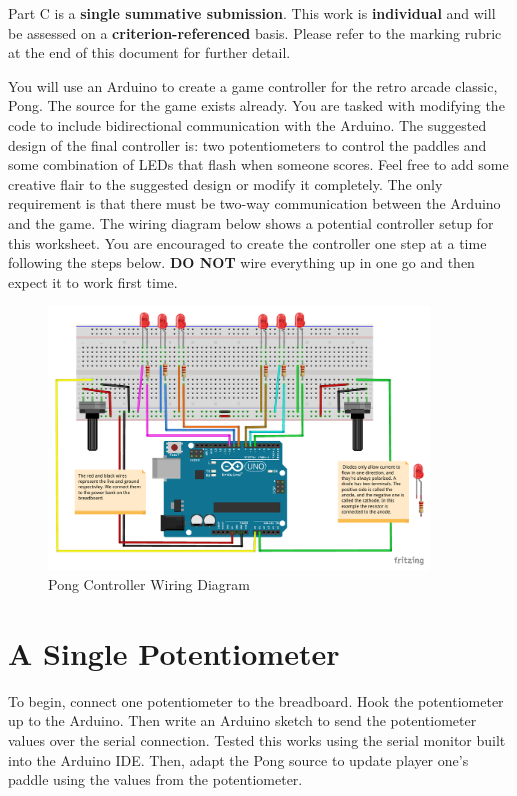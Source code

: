 \documentclass{../../fal_assignment}
\begin{document}
	Part C is a \textbf{single summative submission}. This work is \textbf{individual} and will be assessed on a \textbf{criterion-referenced} basis. Please refer to the marking rubric at the end of this document for further detail.
	
	You will use an Arduino to create a game controller for the retro arcade classic, Pong. The source for the game exists already. You are tasked with modifying the code to include bidirectional communication with the Arduino. The suggested design of the final controller is: two potentiometers to control the paddles and some combination of LEDs that flash when someone scores. Feel free to add some creative flair to the suggested design or modify it completely. The only requirement is that there must be two-way communication between the Arduino and the game. The wiring diagram below shows a potential controller setup for this worksheet. You are encouraged to create the controller one step at a time following the steps below. \textbf{DO NOT} wire everything up in one go and then expect it to work first time. 
	
	\begin{figure}[!ht]
		\begin{center}
			\includegraphics[width=0.9\textwidth]{assets/arduino-pong.pdf}
		\end{center}
		\caption{Pong Controller Wiring Diagram}
		\label{fig:wiring}
	\end{figure}
	
	\section{A Single Potentiometer} \label{arduino-first}
	To begin, connect one potentiometer to the breadboard. Hook the potentiometer up to the Arduino. Then write an Arduino sketch to send the potentiometer values over the serial connection. Tested this works using the serial monitor built into the Arduino IDE. Then, adapt the Pong source to update player one's paddle using the values from the potentiometer. 
	
\end{document}
